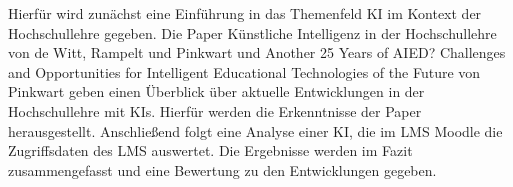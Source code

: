 Hierfür wird zunächst eine Einführung in das Themenfeld KI im Kontext der Hochschullehre gegeben. Die Paper \glqq Künstliche Intelligenz in der Hochschullehre\grqq{} von de Witt, Rampelt und Pinkwart und \glqq Another 25 Years of AIED? Challenges and Opportunities for Intelligent Educational Technologies of the Future\grqq{} von Pinkwart geben einen Überblick über aktuelle Entwicklungen in der Hochschullehre mit KIs. Hierfür werden die Erkenntnisse der Paper herausgestellt. Anschließend folgt eine Analyse einer KI, die im \ac{LMS} Moodle die Zugriffsdaten des \ac{LMS} auswertet. Die Ergebnisse werden im Fazit zusammengefasst und eine Bewertung zu den Entwicklungen gegeben.